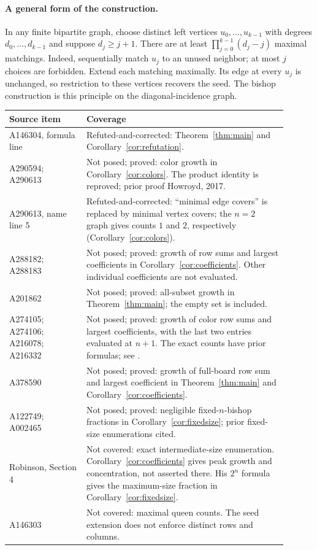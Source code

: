 \documentclass[11pt]{article}
\begin{document}
\paragraph{A general form of the construction.}
In any finite bipartite graph, choose distinct left vertices
$u_0,\ldots,u_{k-1}$ with degrees $d_0,\ldots,d_{k-1}$ and suppose
$d_j\geq j+1$. There are at least
$\prod_{j=0}^{k-1}(d_j-j)$ maximal matchings. Indeed, sequentially
match $u_j$ to an unused neighbor; at most $j$ choices are forbidden.
Extend each matching maximally. Its edge at every $u_j$ is unchanged,
so restriction to these vertices recovers the seed. The bishop
construction is this principle on the diagonal-incidence graph.

\begin{center}
\small
\begin{tabular}{@{}p{0.25\linewidth}p{0.65\linewidth}@{}}
\toprule
Source item & Coverage \\
\midrule
A146304, formula line & Refuted-and-corrected:
Theorem~\ref{thm:main} and Corollary~\ref{cor:refutation}. \\
A290594; A290613 & Not posed; proved: color growth in Corollary~\ref{cor:colors}.
The product identity is reproved; prior proof Howroyd, 2017. \\
A290613, name line 5 & Refuted-and-corrected: ``minimal edge covers''
is replaced by minimal vertex covers; the $n=2$ graph gives counts
$1$ and $2$, respectively (Corollary~\ref{cor:colors}). \\
A288182; A288183 & Not posed; proved: growth of row sums and largest coefficients in
Corollary~\ref{cor:coefficients}. Other individual coefficients are not
evaluated. \\
A201862 & Not posed; proved: all-subset growth in Theorem~\ref{thm:main};
the empty set is included. \\
A274105; A274106; A216078; A216332 & Not posed; proved: growth of color row sums and largest
coefficients, with the last two entries evaluated at $n+1$.
The exact counts have prior formulas; see \cite{santos}. \\
A378590 & Not posed; proved: growth of full-board row sum and largest coefficient in
Theorem~\ref{thm:main} and Corollary~\ref{cor:coefficients}. \\
A122749; A002465 & Not posed; proved: negligible fixed-$n$-bishop fractions in
Corollary~\ref{cor:fixedsize}; prior fixed-size enumerations cited. \\
Robinson, Section 4 & Not covered: exact intermediate-size enumeration.
Corollary~\ref{cor:coefficients} gives peak growth and concentration,
not asserted there. His $2^n$ formula gives the maximum-size fraction in
Corollary~\ref{cor:fixedsize}. \\
A146303 & Not covered: maximal queen counts. The seed extension does
not enforce distinct rows and columns. \\
\bottomrule
\end{tabular}
\end{center}
\end{document}
